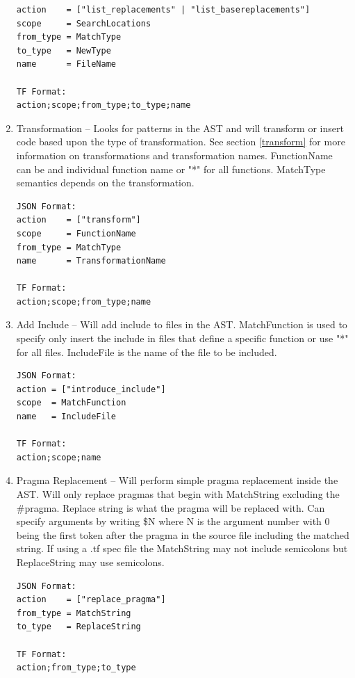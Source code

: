 \documentclass[natbib]{article}
\begin{document}
\begin{enumerate}
\begin{verbatim}
action    = ["list_replacements" | "list_basereplacements"]
scope     = SearchLocations
from_type = MatchType
to_type   = NewType
name      = FileName

TF Format:
action;scope;from_type;to_type;name
\end{verbatim}

\item{} Transformation -- Looks for patterns in the AST and will transform or insert 
code based upon the type of transformation. See section \ref{transform} for more 
information on transformations and transformation names. FunctionName can be and 
individual function name or "*" for all functions. MatchType semantics depends on 
the transformation.

\begin{verbatim}
JSON Format:
action    = ["transform"]
scope     = FunctionName 
from_type = MatchType
name      = TransformationName

TF Format:
action;scope;from_type;name
\end{verbatim}

\item{} Add Include -- Will add include to files in the AST. MatchFunction is used to specify 
only insert the include in files that define a specific function or use "*" for all files. 
IncludeFile is the name of the file to be included.

\begin{verbatim}
JSON Format:
action = ["introduce_include"]
scope  = MatchFunction
name   = IncludeFile

TF Format:
action;scope;name
\end{verbatim}

\item{} Pragma Replacement -- Will perform simple pragma replacement inside the AST. Will only 
replace pragmas that begin with MatchString excluding the \#pragma. Replace string is what the 
pragma will be replaced with. Can specify arguments by writing \$N where N is the argument 
number with 0 being the first token after the pragma in the source file including the matched string.
If using a .tf spec file the MatchString may not include semicolons but ReplaceString may 
use semicolons.

\begin{verbatim}
JSON Format:
action    = ["replace_pragma"]
from_type = MatchString
to_type   = ReplaceString

TF Format:
action;from_type;to_type
\end{verbatim}
\end{enumerate}
\end{document}
